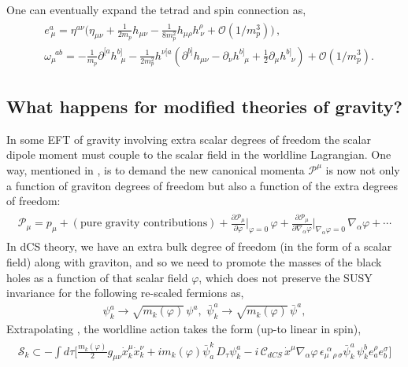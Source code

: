 One can eventually expand the tetrad and spin connection as,
{\small
\begin{align}
    \begin{split}
& e^a_{\,\mu}=\eta^{a\nu}\Big(\eta_{\mu\nu}+\frac{1}{2m_p}h_{\mu\nu}-\frac{1}{8m_p^2}h_{\mu\rho}h^{\rho}_{\,\nu}+\mathcal{O}(1/m_p^3)\Big)\,,\\ &
\omega_{\mu}^{\,\,\,ab}=-\frac{1}{m_p}\partial^{[a}h^{b]}_{\,\,\,\mu}-\frac{1}{2m_p^2}h^{\nu[a}\left(\partial^{b]}h_{\mu \nu}-\partial_\nu h^{b]}_{\,\,\,\,\mu}+\frac{1}{2}\partial_\mu h^{b]}_{\,\,\,\,\nu}\right)+\mathcal{O}(1/m_p^3).
    \end{split}
\end{align}
}
\subsection*{What happens for modified theories of gravity?}
In some EFT of gravity involving extra scalar degrees of freedom the scalar dipole moment must couple to the scalar field in the worldline Lagrangian. One way, mentioned in \cite{Loutrel:2018ydv}, is to demand the new canonical momenta $\mathcal{P}^\mu$ is now not only a function of graviton degrees of freedom but also a function of the extra degrees of freedom:
\begingroup
\small
\begin{align}
    \begin{split}
        \mathcal{P}_\mu=p_{\mu}+(\textrm{pure gravity contributions})+\frac{\partial \mathcal{P_{\mu}}}{\partial{\varphi}}\Bigg|_{\varphi=0}\,\varphi+\frac{\partial \mathcal{P_{\mu}}}{\partial{\nabla_{\alpha}\varphi}}\Bigg|_{\nabla_\alpha\varphi=0}\,\nabla_{\alpha}\varphi+\cdots\label{2.13k}
    \end{split}
\end{align}
\endgroup
In dCS theory, we have an extra bulk degree of freedom (in the form of a scalar field) along with graviton, and so we need to promote the masses of the black holes as a function of that scalar field $\varphi$, which  does not preserve the SUSY invariance for the following re-scaled fermions as,
\begingroup
\small
\begin{align}
    \psi_k^a \to \sqrt{m_k(\varphi)}\,\psi^a,\,\,\bar\psi_k^a \to \sqrt{m_k(\varphi)}\,\bar\psi^a,
\end{align}
\endgroup
 Extrapolating \cite{Loutrel:2018ydv}, the worldline action takes the form (up-to linear in spin),
\begin{align}
    \begin{split}
        \mathcal{S}_k\subset -\int d\tau \Big[\frac{m_k(\varphi)}{2}g_{\mu\nu}\dot x_k^\mu \dot x_k^\nu+i m_{k}(\varphi)\bar\psi_a^k\, D_{\tau}\psi^a_k-i\,\mathcal{C}_{dCS} \,\dot{x}^{\mu} \nabla_{\alpha}\varphi\,\epsilon_{\mu\,\,\,\rho\,\sigma}^{\,\,\alpha}\bar{\psi}_k^a\,\psi_k^{b}e^{\rho}_a e^{\sigma}_{b}\Big]\label{2.13d}
    \end{split}
\end{align}
